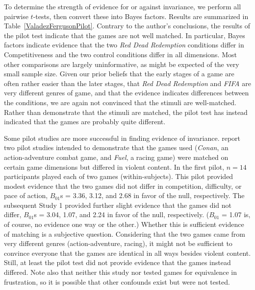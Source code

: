 \documentclass[man]{apa6}
\begin{document}
To determine the strength of evidence for or against invariance, we perform all pairwise $t$-tests, then convert these into Bayes factors. Results are summarized in Table~\ref{ValadezFergusonPilot}. Contrary to the author's conclusions, the results of the pilot test indicate that the games are not well matched. In particular, Bayes factors indicate evidence that the two {\em Red Dead Redemption} conditions differ in Competitiveness and the two control conditions differ in all dimensions. Most other comparisons are largely uninformative, as might be expected of the very small sample size. Given our prior beliefs that the early stages of a game are often rather easier than the later stages, that {\em Red Dead Redemption} and {\em FIFA} are very different genres of game, and that the evidence indicates differences between the conditions, we are again not convinced that the stimuli are well-matched. Rather than demonstrate that the stimuli are matched, the pilot test has instead indicated that the games are probably quite different. %

Some pilot studies are more successful in finding evidence of invariance. \citet{Adachi:Willoughby:2011} report two pilot studies intended to demonstrate that the games used ({\em Conan}, an action-adventure combat game, and {\em Fuel}, a racing game) were matched on certain game dimensions but differed in violent content. In the first pilot, $n = 14$ participants played each of two games (within-subjects). This pilot provided modest evidence that the two games did not differ in competition, difficulty, or pace of action, $B_{01}$s = 3.36, 3.12, and 2.68 in favor of the null, respectively. The subsequent Study 1 provided further slight evidence that the games did not differ, $B_{01}$s = 3.04, 1.07, and 2.24 in favor of the null, respectively. ($B_{01}$ = 1.07 is, of course, no evidence one way or the other.) Whether this is sufficient evidence of matching is a subjective question. Considering that the two games came from very different genres (action-adventure, racing), it might not be sufficient to convince everyone that the games are identical in all ways besides violent content. Still, at least the pilot test did not provide evidence that the games instead differed. Note also that neither this study nor \citet{Valadez:Ferguson:2012} tested games for equivalence in frustration, so it is possible that other confounds exist but were not tested.
\end{document}
